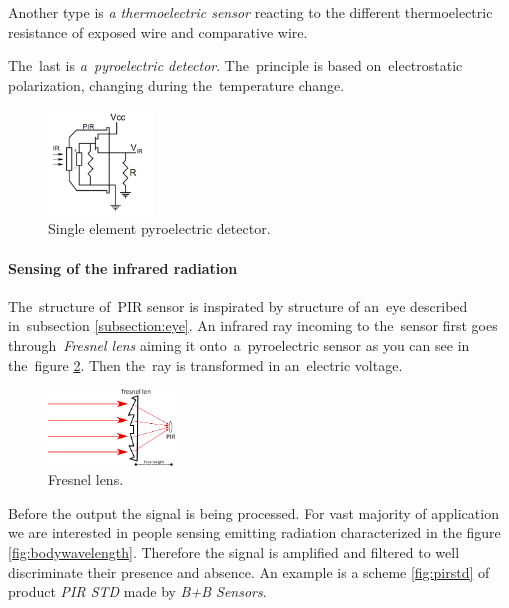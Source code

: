 Another type is {\it a thermoelectric sensor} reacting to the different thermoelectric resistance of
exposed wire and comparative wire.

The~last is {\it a~pyroelectric detector}. The~principle is based on~electrostatic polarization,
changing during the~temperature change. \cite{DetectorsBook}

\begin{figure}[h!]
\begin{center}
\includegraphics[width=0.25\textwidth]{img/pirscheme.png}
\caption{Single element pyroelectric detector.\cite{an2105}\label{fig:pir}}
\end{center}    
\end{figure}


\paragraph{Sensing of the infrared radiation}
The~structure of~PIR sensor is inspirated by structure of an~eye described in~subsection \ref{subsection:eye}.
An infrared ray incoming to the~sensor first goes through~{\it Fresnel lens} aiming it onto~a~pyroelectric sensor
as you can see in the~figure \ref{fig:fresnellens}. Then the~ray is transformed in an~electric voltage.

\begin{figure}[h!]
\begin{center}
\includegraphics[width=0.3\textwidth]{img/fresnellens.png}
\caption{Fresnel lens.\label{fig:fresnellens}}
\end{center}
\end{figure}

Before the output the signal is being processed. For vast majority of application we are interested in
people sensing emitting radiation characterized in the figure \ref{fig:bodywavelength}.
Therefore the signal is amplified and filtered to well discriminate their presence and absence.
An example is a scheme \ref{fig:pirstd} of product {\it PIR STD} made by {\it B+B Sensors}.

